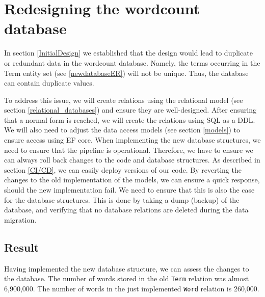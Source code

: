 \section{Redesigning the wordcount database}
In section \ref{InitialDesign} we established that the design would lead to duplicate or redundant data in the wordcount database.
Namely, the terms occurring in the Term entity set (see \ref{newdatabaseER}) will not be unique. 
Thus, the database can contain duplicate values.
 
To address this issue, we will create relations using the relational model (see section \ref{relational_databases}) and ensure they are well-designed.
After ensuring that a normal form is reached, we will create the relations using SQL as a DDL.
We will also need to adjust the data access models (see section \ref{models}) to ensure access using EF core.
When implementing the new database structures, we need to ensure that the pipeline is operational. 
Therefore, we have to ensure we can always roll back changes to the code and database structures.
As described in section \ref{CI/CD}, we can easily deploy versions of our code. By reverting the changes to the old implementation of the models, we can ensure a quick response, should the new implementation fail.
We need to ensure that this is also the case for the database structures.
This is done by taking a dump (backup) of the database, and verifying that no database relations are deleted during the data migration.




\subsection{Result}
Having implemented the new database structure, we can assess the changes to the database. 
The number of words stored in the old \texttt{Term} relation was almost 6,900,000.
The number of words in the just implemented \texttt{Word} relation is 260,000.


